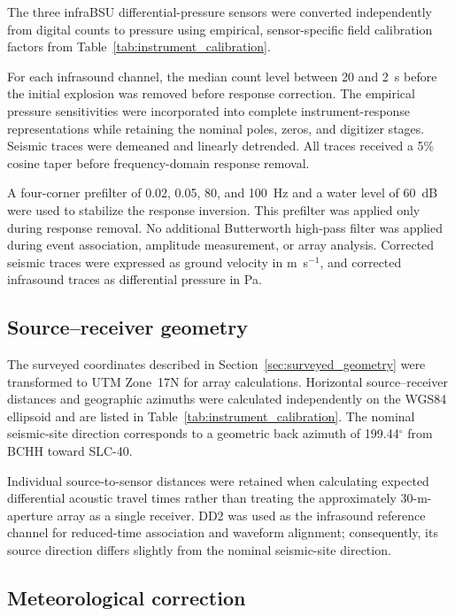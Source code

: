 \documentclass[]{seismica}
\begin{document}
The three infraBSU differential-pressure sensors were converted independently
from digital counts to pressure using empirical, sensor-specific field
calibration factors from Table~\ref{tab:instrument_calibration}.

For each infrasound channel, the median count level between 20 and 2~s before
the initial explosion was removed before response correction. The empirical
pressure sensitivities were incorporated into complete instrument-response
representations while retaining the nominal poles, zeros, and digitizer
stages. Seismic traces were demeaned and linearly detrended. All traces received
a 5\% cosine taper before frequency-domain response removal.

A four-corner prefilter of 0.02, 0.05, 80, and 100~Hz and a water level of
60~dB were used to stabilize the response inversion. This prefilter was applied
only during response removal. No additional Butterworth high-pass filter was
applied during event association, amplitude measurement, or array analysis.
Corrected seismic traces were expressed as ground velocity in
m~s$^{-1}$, and corrected infrasound traces as differential pressure in Pa.


\subsection{Source--receiver geometry}

The surveyed coordinates described in
Section~\ref{sec:surveyed_geometry} were transformed
to UTM Zone~17N for array calculations. Horizontal source--receiver distances
and geographic azimuths were calculated independently on the WGS84 ellipsoid
and are listed in Table~\ref{tab:instrument_calibration}. The nominal
seismic-site direction corresponds to a geometric back azimuth of
199.44$^\circ$ from BCHH toward SLC-40.

Individual source-to-sensor distances were retained when calculating expected
differential acoustic travel times rather than treating the approximately
30-m-aperture array as a single receiver. DD2 was used as the infrasound
reference channel for reduced-time association and waveform alignment;
consequently, its source direction differs slightly from the nominal
seismic-site direction.

\subsection{Meteorological correction}
\end{document}
